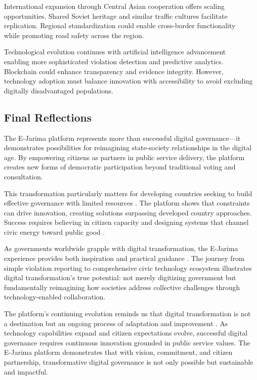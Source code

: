 \documentclass[pdflatex,sn-mathphys-num]{sn-jnl}%
\theoremstyle{thmstyleone}%
\theoremstyle{thmstyletwo}%
\theoremstyle{thmstylethree}%
\begin{document}
International expansion through Central Asian cooperation offers scaling opportunities. Shared Soviet heritage and similar traffic cultures facilitate replication. Regional standardization could enable cross-border functionality while promoting road safety across the region.

Technological evolution continues with artificial intelligence advancement enabling more sophisticated violation detection and predictive analytics. Blockchain could enhance transparency and evidence integrity. However, technology adoption must balance innovation with accessibility to avoid excluding digitally disadvantaged populations.

\subsection{Final Reflections}\label{subsec27}

The E-Jarima platform represents more than successful digital governance—it demonstrates possibilities for reimagining state-society relationships in the digital age. By empowering citizens as partners in public service delivery, the platform creates new forms of democratic participation beyond traditional voting and consultation.

This transformation particularly matters for developing countries seeking to build effective governance with limited resources \cite{heeks2018ict4d}. The platform shows that constraints can drive innovation, creating solutions surpassing developed country approaches. Success requires believing in citizen capacity and designing systems that channel civic energy toward public good \cite{noveck2015smart}.

As governments worldwide grapple with digital transformation, the E-Jarima experience provides both inspiration and practical guidance \cite{janowski2015digital,west2004egovernment}. The journey from simple violation reporting to comprehensive civic technology ecosystem illustrates digital transformation's true potential: not merely digitizing government but fundamentally reimagining how societies address collective challenges through technology-enabled collaboration.

The platform's continuing evolution reminds us that digital transformation is not a destination but an ongoing process of adaptation and improvement \cite{fountain2001building,gill2017digital}. As technology capabilities expand and citizen expectations evolve, successful digital governance requires continuous innovation grounded in public service values. The E-Jarima platform demonstrates that with vision, commitment, and citizen partnership, transformative digital governance is not only possible but sustainable and impactful.
\end{document}
